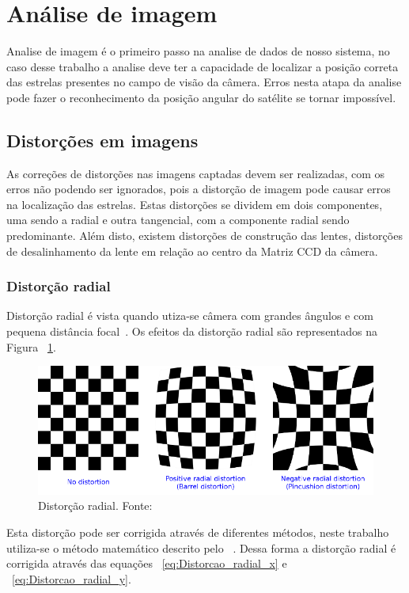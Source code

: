 \section{Análise de imagem}

Analise de imagem é o primeiro passo na analise de dados de nosso sistema, 
no caso desse trabalho a analise deve ter a capacidade de localizar a posição correta das estrelas presentes no campo de visão da câmera.
Erros nesta atapa da analise pode fazer o reconhecimento da posição angular do satélite se tornar impossível.

\subsection{Distorções em imagens}

As correções de distorções nas imagens captadas devem ser realizadas, 
com os erros não podendo ser ignorados, pois a distorção de imagem pode causar erros na localização das estrelas. 
Estas distorções se dividem em dois componentes, uma sendo a radial e outra tangencial, com a componente radial sendo predominante.
Além disto, existem distorções de construção das lentes, distorções de desalinhamento da lente em relação ao centro da Matriz CCD da câmera.

\subsubsection{Distorção radial}
Distorção radial é vista quando utiza-se câmera com grandes ângulos e com pequena distância focal~\cite[]{Mallon}.
Os efeitos da distorção radial são representados na Figura ~\ref{fig:Distorcao_radial}.

\begin{figure}[H]
	\centering
	\includegraphics[width=.7\columnwidth]{images/Distorcao_radial.png}
	\caption{Distorção radial. Fonte: ~\cite[]{ozcakir_2020}}
	\label{fig:Distorcao_radial}
\end{figure}

Esta distorção pode ser corrigida através de diferentes métodos, neste trabalho utiliza-se o método matemático descrito pelo ~\cite[]{opencv_library}.
Dessa forma a distorção radial é corrigida através das equações ~\ref{eq:Distorcao_radial_x} e ~\ref{eq:Distorcao_radial_y}.

